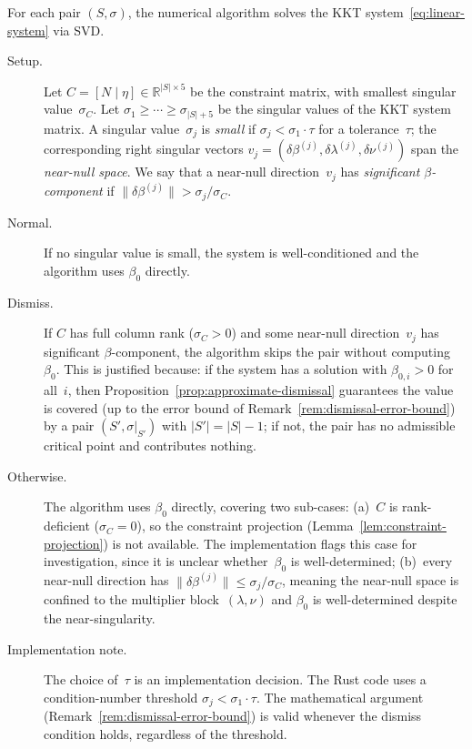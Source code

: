 \begin{algorithm}%
\label{alg:near-singular-handling}
For each pair $(S, \sigma)$, the numerical algorithm solves
the KKT system~\eqref{eq:linear-system} via SVD.

\begin{description}
\item[Setup.]
  Let $C = [N \mid \eta] \in \mathbb{R}^{|S| \times 5}$
  be the constraint matrix, with smallest singular
  value~$\sigma_C$.
  Let $\sigma_1 \geq \cdots \geq \sigma_{|S|+5}$ be the singular
  values of the KKT system matrix.
  A singular value~$\sigma_j$ is \emph{small} if
  $\sigma_j < \sigma_1 \cdot \tau$ for a tolerance~$\tau$;
  the corresponding right singular vectors
  $v_j = (\delta\beta^{(j)}, \delta\lambda^{(j)},
  \delta\nu^{(j)})$ span the \emph{near-null space}.
  We say that a near-null direction~$v_j$ has
  \emph{significant $\beta$-component} if
  $\|\delta\beta^{(j)}\| > \sigma_j / \sigma_C$.

\item[Normal.]
  If no singular value is small, the system is
  well-conditioned and the algorithm uses $\beta_0$ directly.

\item[Dismiss.]
  If $C$ has full column rank ($\sigma_C > 0$) and some
  near-null direction~$v_j$ has significant
  $\beta$-component,
  the algorithm skips the pair without computing~$\beta_0$.
  This is justified because:
  if the system has a solution with $\beta_{0,i} > 0$ for
  all~$i$, then
  Proposition~\ref{prop:approximate-dismissal} guarantees
  the value is covered (up to the error bound of
  Remark~\ref{rem:dismissal-error-bound}) by a pair
  $(S', \sigma|_{S'})$ with $|S'| = |S| - 1$;
  if not, the pair has no admissible critical point and
  contributes nothing.

\item[Otherwise.]
  The algorithm uses $\beta_0$ directly,
  covering two sub-cases:
  (a)~$C$ is rank-deficient ($\sigma_C = 0$), so the
  constraint projection
  (Lemma~\ref{lem:constraint-projection}) is not available.
  The implementation flags this case for investigation,
  since it is unclear whether~$\beta_0$ is well-determined;
  (b)~every near-null direction has
  $\|\delta\beta^{(j)}\| \leq \sigma_j / \sigma_C$,
  meaning the near-null space is confined to the
  multiplier block~$(\lambda, \nu)$ and $\beta_0$ is
  well-determined despite the near-singularity.

\item[Implementation note.]
  The choice of~$\tau$ is an implementation decision.
  The Rust code uses a condition-number threshold
  $\sigma_j < \sigma_1 \cdot \tau$.
  The mathematical argument
  (Remark~\ref{rem:dismissal-error-bound}) is valid whenever
  the dismiss condition holds, regardless of the threshold.
\end{description}
\end{algorithm}

